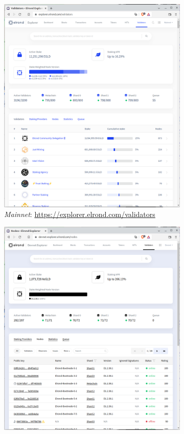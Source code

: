 \documentclass[11pt,a4paper]{article}
\begin{document}
\begin{figure}[!htb]
\begin{subfigure}[b]{0.32\textwidth}
  \includegraphics[width=\linewidth]{mainnet.png}
  \caption{\textit{Mainnet}: \scriptsize\url{https://explorer.elrond.com/validators}}\label{fig:mainnet}
\end{subfigure}\hfill
\begin{subfigure}[b]{0.32\textwidth}
  \includegraphics[width=\linewidth]{devnet.png}

\end{subfigure}
\end{figure}
\end{document}
